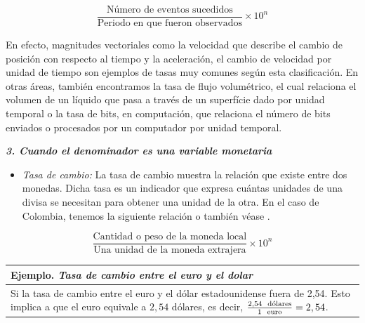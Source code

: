 \documentclass[
]{book}
\providecommand{\tightlist}{%
  \setlength{\itemsep}{0pt}\setlength{\parskip}{0pt}}
\begin{document}
\[\begin{equation}
\frac{\text{Número de eventos sucedidos}}{\text{Periodo en que fueron observados}}\times 10^{n}
\end{equation}\]

En efecto, magnitudes vectoriales como la velocidad que describe el cambio de posición con respecto al tiempo y la aceleración, el cambio de velocidad por unidad de tiempo son ejemplos de tasas muy comunes según esta clasificación. En otras áreas, también encontramos la tasa de flujo volumétrico, el cual relaciona el volumen de un líquido que pasa a través de un superfície dado por unidad temporal o la tasa de bits, en computación, que relaciona el número de bits enviados o procesados por un computador por unidad temporal.

\textbf{\emph{3. Cuando el denominador es una variable monetaria }}

\begin{itemize}
\tightlist
\item
  \emph{Tasa de cambio:} La tasa de cambio muestra la relación que existe entre dos monedas. Dicha tasa es un indicador que expresa cuántas unidades de una divisa se necesitan para obtener una unidad de la otra. En el caso de Colombia, tenemos la siguiente relación o también véase \citet{BibEntry2019Jun}.
\end{itemize}

\[\begin{equation}
\frac{\text{Cantidad o peso de la moneda local}}{\text{Una unidad de la moneda extrajera}}\times 10^{n}
\end{equation}\]

\begin{longtable}[]{@{}l@{}}
\toprule
\begin{minipage}[b]{0.97\columnwidth}\raggedright
Ejemplo. \emph{Tasa de cambio entre el euro y el dolar}\strut
\end{minipage}\tabularnewline
\midrule
\endhead
\begin{minipage}[t]{0.97\columnwidth}\raggedright
Si la tasa de cambio entre el euro y el dólar estadounidense fuera de 2,54. Esto implica a que el euro equivale a \(2,54\) dólares, es decir, \(\frac{2,54 \hspace{2mm} \text{dólares}}{1 \hspace{2mm}\text{euro}}= 2,54\).\strut
\end{minipage}\tabularnewline
\bottomrule
\end{longtable}
\end{document}

